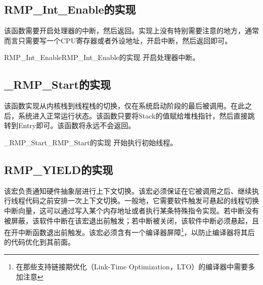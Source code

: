 \subsection{RMP\_Int\_Enable的实现}\label{subsec:implementation-of-rmp-int-enable}

该函数需要开启处理器的中断，然后返回。实现上没有特别需要注意的地方，通常而言只需要写一个CPU寄存器或者外设地址，开启中断，然后返回即可。

\begin{apidesc}{RMP\_Int\_Enable}{RMP\_Int\_Enable的实现}
    开启处理器中断。
    \begin{apiparams}
    \end{apiparams}
    \begin{apiret}
    \end{apiret}
\end{apidesc}

\subsection{\_RMP\_Start的实现}\label{subsec:implementation-of-rmp-start}

该函数实现从内核栈到线程栈的切换，仅在系统启动阶段的最后被调用。在此之后，系统进入正常运行状态。该函数只要将Stack的值赋给堆栈指针，然后直接跳转到Entry即可。该函数将永远不会返回。

\begin{apidesc}{\_RMP\_Start}{\_RMP\_Start的实现}
    开始执行初始线程。
    \begin{apiparams}
    \end{apiparams}
    \begin{apiret}
    \end{apiret}
\end{apidesc}

\subsection{RMP\_YIELD的实现}\label{subsec:implementation-of-rmp-yield}

该宏负责通知硬件抽象层进行上下文切换。该宏必须保证在它被调用之后、继续执行线程代码之前安排一次上下文切换。一般地，它需要软件触发可悬起的线程切换中断向量，这可以通过写入某个内存地址或者执行某条特殊指令实现。若中断没有被屏蔽，该软件中断在该宏退出前触发；若中断被关闭，该软件中断必须悬起，且在开中断函数退出前触发。该宏必须含有一个编译器屏障\footnote{在那些支持链接期优化（Link-Time Optimization，LTO）的编译器中需要多加注意}，以防止编译器将其后的代码优化到其前面。

